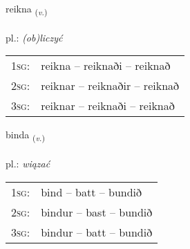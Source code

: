 \documentclass[frontgrid, backgrid]{flacards}\usepackage[]{graphicx}\usepackage[]{xcolor}
\begin{document}
\renewcommand{\flhead}{\vskip5pt \fboxsep=0pt {\small\bfseries\footnotesize Sagnorð | Verb}}
\renewcommand{\fcfoot}{\vskip5pt \fboxsep=0pt \hspace{2pt}{\small\bfseries\footnotesize 1K}}

\renewcommand{\blhead}{\vskip5pt {\small\bfseries\footnotesize Sagnorð | Verb }}
\renewcommand{\bcfoot}{\vskip5pt \hspace{2pt}{\small\bfseries\footnotesize 1K}}


{reikna \small{\textsubscript{(\textit{v.})}} \\[1ex] %
\textphonetic{[reihkna]} \\
pl.: \emph{(ob)liczyć} \\  [2ex]
\renewcommand*{\arraystretch}{0.8}
\begin{tabular}{p{1cm}l}
\textsc{1sg}: & reikna -- reiknaði -- reiknað \\ 
\textsc{2sg}: & reiknar -- reiknaðir -- reiknað \\ 
\textsc{3sg}: & reiknar -- reiknaði -- reiknað \\ 
\end{tabular}
}

\renewcommand{\flhead}{\vskip5pt \fboxsep=0pt {\small\bfseries\footnotesize Sagnorð | Verb}}
\renewcommand{\fcfoot}{\vskip5pt \fboxsep=0pt \hspace{2pt}{\small\bfseries\footnotesize 1K}}

\renewcommand{\blhead}{\vskip5pt {\small\bfseries\footnotesize Sagnorð | Verb }}
\renewcommand{\bcfoot}{\vskip5pt \hspace{2pt}{\small\bfseries\footnotesize 1K}}


{binda \small{\textsubscript{(\textit{v.})}} \\[1ex] %
\textphonetic{[pɪnta]} \\
pl.: \emph{wiązać} \\  [2ex]
\renewcommand*{\arraystretch}{0.8}
\begin{tabular}{p{1cm}l}
\textsc{1sg}: & bind -- batt -- bundið \\ 
\textsc{2sg}: & bindur -- bast -- bundið \\ 
\textsc{3sg}: & bindur -- batt -- bundið \\ 
\end{tabular}
}
\end{document}
